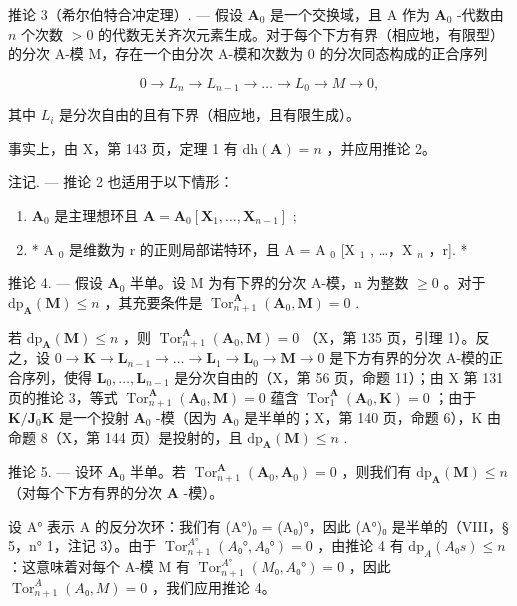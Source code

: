 推论 3（希尔伯特合冲定理）. --- 假设 \(\mathbf{A}_0\) 是一个交换域，且 A 作为 \(\mathbf{A}_0\) -代数由 \(n\) 个次数 \(>0\) 的代数无关齐次元素生成。对于每个下方有界（相应地，有限型）的分次 A-模 M，存在一个由分次 A-模和次数为 0 的分次同态构成的正合序列

\[
0 \rightarrow L _ {n} \rightarrow L _ {n - 1} \rightarrow \dots \rightarrow L _ {0} \rightarrow M \rightarrow 0,
\]

其中 \(L_{i}\) 是分次自由的且有下界（相应地，且有限生成）。

事实上，由 X，第 143 页，定理 1 有 \(\mathrm{dh}(\mathbf{A}) = n\) ，并应用推论 2。

注记. --- 推论 2 也适用于以下情形：

\begin{enumerate}
\def\labelenumi{\alph{enumi})}
\item
  \(\mathbf{A}_0\) 是主理想环且 \(\mathbf{A} = \mathbf{A}_0[\mathbf{X}_1, \dots, \mathbf{X}_{n-1}]\) ;
\item
  * A \(_{0}\) 是维数为 r 的正则局部诺特环，且 A = A \(_{0}\) {[}X \(_{1}\) , \ldots，X \(_{n}\) ，r{]}. *
\end{enumerate}

推论 4. --- 假设 \(\mathbf{A}_{0}\) 半单。设 M 为有下界的分次 A-模，n 为整数 \(\geqslant 0\) 。对于 \(\mathrm{dp}_{\mathbf{A}}(\mathbf{M}) \leqslant n\) ，其充要条件是 \(\operatorname{Tor}_{n+1}^{\mathbf{A}}(\mathbf{A}_{0}, \mathbf{M}) = 0\) .

若 \(\mathrm{dp}_{\mathbf{A}}(\mathbf{M}) \leqslant n\) ，则 \(\operatorname{Tor}_{n+1}^{\mathbf{A}}(\mathbf{A}_0, \mathbf{M}) = 0\) （X，第 135 页，引理 1）。反之，设 \(0 \to \mathbf{K} \to \mathbf{L}_{n-1} \to \ldots \to \mathbf{L}_1 \to \mathbf{L}_0 \to \mathbf{M} \to 0\) 是下方有界的分次 A-模的正合序列，使得 \(\mathbf{L}_0, \ldots, \mathbf{L}_{n-1}\) 是分次自由的（X，第 56 页，命题 11）；由 X 第 131 页的推论 3，等式 \(\operatorname{Tor}_{n+1}^{\mathbf{A}}(\mathbf{A}_0, \mathbf{M}) = 0\) 蕴含 \(\operatorname{Tor}_1^{\mathbf{A}}(\mathbf{A}_0, \mathbf{K}) = 0\) ；由于 \(\mathbf{K} / \mathbf{J}_0\mathbf{K}\) 是一个投射 \(\mathbf{A}_0\) -模（因为 \(\mathbf{A}_0\) 是半单的；X，第 140 页，命题 6），K 由命题 8（X，第 144 页）是投射的，且 \(\mathrm{dp}_{\mathbf{A}}(\mathbf{M}) \leqslant n\) .

推论 5. --- 设环 \(\mathbf{A}_0\) 半单。若 \(\operatorname{Tor}_{n+1}^{\mathbf{A}}(\mathbf{A}_0, \mathbf{A}_0) = 0\) ，则我们有 \(\mathrm{dp}_{\mathbf{A}}(\mathbf{M}) \leqslant n\) （对每个下方有界的分次 \(\mathbf{A}\) -模）。

设 A° 表示 A 的反分次环：我们有 (A°)₀ = (A₀)°，因此 (A°)₀ 是半单的（VIII，§ 5，n° 1，注记 3）。由于 \(\operatorname{Tor}_{n+1}^{A°}(A₀°, A₀°) = 0\) ，由推论 4 有 \(\mathrm{dp}_A(A₀s) \leqslant n\) ：这意味着对每个 A-模 M 有 \(\operatorname{Tor}_{n+1}^{A°}(M₀, A₀°) = 0\) ，因此 \(\operatorname{Tor}_{n+1}^{A}(A₀, M) = 0\) ，我们应用推论 4。

